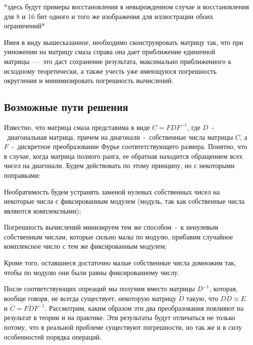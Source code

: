 \documentclass[a4paper]{article}
\theoremstyle{definition}
\newcounter{qcounter}
\begin{document}
    *здесь будут примеры восстановления в невырожденном случае и восстановления для 8 и 16 бит одного и того же изображения для иллюстрации обоих ограничений*


    Имея в виду вышесказанное, необходимо сконструировать матрицу так, что при умножении на матрицу смаза справа она дает приближение единичной матрицы~---~это даст сохранение результата, максимально приближенного к исходному теоретически, а также учесть уже имеющуюся погрешность округления и минимизировать погрешность вычислений.


    \subsection{Возможные пути решения}


    Известно, что матрица смаза представима в виде $C = FDF^{-1}$, где $D$~-~диагональная матрица, причем на диагонали~-~собственные числа матрицы $C$, а $F$~-~дискретное преобразование Фурье соотвтетствующего размера. Понятно, что в случае, когда матрица полного ранга, ее обратная находится обращением всех чисел на диагонали. Будем действовать по этому принципу, но с некоторыми поправками:


    \begin{list}{)~}{}
        \item Необратимость будем устранять заменой нулевых собственных чисел на некоторые числа с фиксированным модулем (модуль, так как собственные числа являются комплексными);
        \item Погрешность вычислений минизируем тем же способом~-~к ненулевым собственным числам, которые сильно малы по модулю, прибавим случайное комплексное число с тем же фиксированным модулем;
        \item Кроме того, оставшиеся достаточно малые собственные числа домножим так, чтобы по модулю они были равны фиксированному числу.
    \end{list}



    После соответствующих опреаций мы получим вместо матрицы $D^{-1}$, которая, вообще говоря, не всегда существует, некоторую матрицу $\tilde{D}$ такую, что $D\tilde{D} \approx E$ и $\tilde{C} = F\tilde{D}F^{-1}$. Рассмотрим, каким образом эти два преобразования повлияют на результат в теории и на практике. Эти результаты будут отличаться не только потому, что в реальной проблеме существуют погрешности, но так же и в силу особенностей порядка операций.
\end{document}
